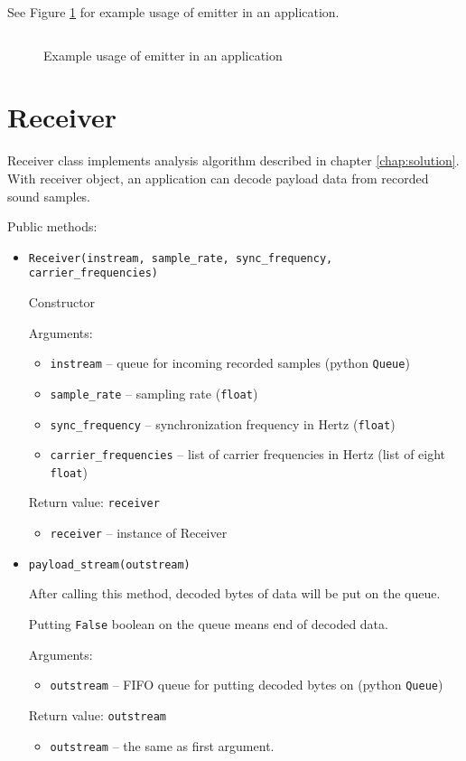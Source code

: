 See Figure \ref{fig:emitter-application} for example usage of emitter in an application.

\begin{figure}[h]
\centering
\inputminted[linenos]{python}{listings/emitter_example.py}
\caption{Example usage of emitter in an application}
\label{fig:emitter-application}
\end{figure}

\clearpage

\section{Receiver}

Receiver class implements analysis algorithm described in chapter \ref{chap:solution}. With receiver object, an application can decode payload data from recorded sound samples.

Public methods:

\begin{itemize}
\item \verb|Receiver(instream, sample_rate, sync_frequency, carrier_frequencies)|

  Constructor

  Arguments:
  \begin{itemize}
  \item \verb|instream| -- queue for incoming recorded samples (python \verb|Queue|)
  \item \verb|sample_rate| -- sampling rate (\verb|float|)
  \item \verb|sync_frequency| -- synchronization frequency in Hertz (\verb|float|)
  \item \verb|carrier_frequencies| -- list of carrier frequencies in Hertz (list of eight \verb|float|)
  \end{itemize}

  Return value: \verb|receiver|
  \begin{itemize}
  \item \verb|receiver| -- instance of Receiver
  \end{itemize}

\item \verb|payload_stream(outstream)|

  After calling this method, decoded bytes of data will be put on the queue.

  Putting \verb|False| boolean on the queue means end of decoded data.

  Arguments:
  \begin{itemize}
  \item \verb|outstream| -- FIFO queue for putting decoded bytes on (python \verb|Queue|)
  \end{itemize}

  Return value: \verb|outstream|
  \begin{itemize}
  \item \verb|outstream| -- the same as first argument.
  \end{itemize}

\end{itemize}

